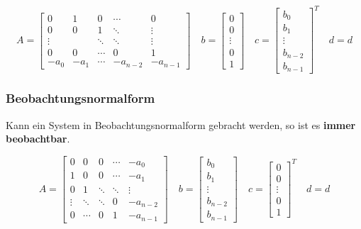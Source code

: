 $$
A =
\begin{bmatrix}
    0       & 1         & 0         & \cdots    & 0         \\
    0       & 0         & 1         & \ddots    & \vdots    \\
    \vdots  &           & \ddots    & \ddots    & \vdots    \\
    0       & 0         & \cdots   & 0         & 1         \\
    -a_0    & -a_1      & \cdots    & -a_{n-2}  & -a_{n-1}
\end{bmatrix}
\quad
b =
\begin{bmatrix}
    0 \\ 0 \\ \vdots \\ 0 \\ 1
\end{bmatrix}
\quad
c =
\begin{bmatrix}
    b_0 \\ b_1 \\ \vdots \\ b_{n-2} \\ b_{n-1}
\end{bmatrix}^{T}
\quad
d = d
$$



\subsubsection{Beobachtungsnormalform}

Kann ein System in Beobachtungsnormalform gebracht werden, so ist es \textbf{immer beobachtbar}.

$$
A =
\begin{bmatrix}
    0       & 0         & 0         & \cdots    & -a_0      \\
    1       & 0         & 0         & \cdots    & -a_1      \\
    0       & 1         & \ddots    & \ddots    & \vdots    \\
    \vdots  & \ddots    & \ddots    & 0         & -a_{n-2}  \\
    0       & \cdots    & 0         & 1         & -a_{n-1}
\end{bmatrix}
\quad
b =
\begin{bmatrix}
    b_0 \\ b_1 \\ \vdots \\ b_{n-2} \\ b_{n-1}
\end{bmatrix}
\quad
c =
\begin{bmatrix}
    0 \\ 0 \\ \vdots \\ 0 \\ 1
\end{bmatrix}^{T}
\quad
d = d
$$

